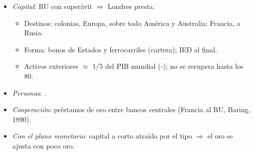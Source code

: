 \documentclass{article}
\begin{document}
\begin{columnas}
\begin{itemize}
\item \emph{Capital}: RU con superávit $\Rightarrow$ Londres presta.
  \begin{itemize}
  \item Destinos: colonias, Europa, sobre todo América y Australia; Francia, a Rusia.
  \item Forma: bonos de Estados y ferrocarriles (cartera); IED al final.
  \item Activos exteriores $\approx$ 1/5 del PIB mundial (-); no se recupera hasta los 80.
  \end{itemize}
\item \emph{Personas}: .
\item \emph{Cooperación}: préstamos de oro entre bancos centrales (Francia al RU, Baring, 1890).
\item \emph{Con el plano monetario}: capital a corto atraído por el tipo $\Rightarrow$ el oro se ajusta con poco oro.
\end{itemize}


\end{columnas}
\end{document}
